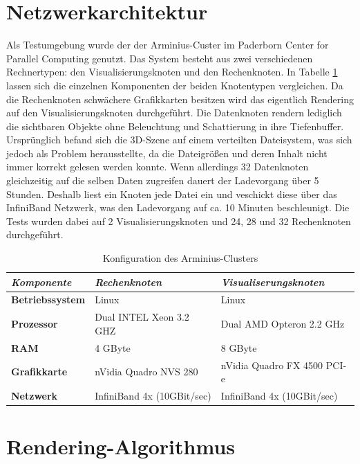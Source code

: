 \section{Netzwerkarchitektur}
\label{sec:impl:netzwerkarchitektur}
Als Testumgebung wurde der der Arminius-Custer im Paderborn Center for Parallel Computing \cite{pc2} genutzt. Das System besteht aus zwei verschiedenen Rechnertypen: den Visualisierungsknoten und den Rechenknoten. In Tabelle \ref{tab:impl:arminius} lassen sich die einzelnen Komponenten der beiden Knotentypen vergleichen. Da die Rechenknoten schwächere Grafikkarten besitzen wird das eigentlich Rendering auf den Visualisierungsknoten durchgeführt. Die Datenknoten rendern lediglich die sichtbaren Objekte ohne Beleuchtung und Schattierung in ihre Tiefenbuffer.\\
Ursprünglich befand sich die 3D-Szene auf einem verteilten Dateisystem, was sich jedoch als Problem herausstellte, da die Dateigrößen und deren Inhalt nicht immer korrekt gelesen werden konnte. Wenn allerdings 32 Datenknoten gleichzeitig auf die selben Daten zugreifen dauert der Ladevorgang über 5 Stunden. Deshalb liest ein Knoten jede Datei ein und veschickt diese über das InfiniBand Netzwerk, was den Ladevorgang auf ca. 10 Minuten beschleunigt. Die Tests wurden dabei auf 2 Visualisierungsknoten und 24, 28 und 32 Rechenknoten durchgeführt.

\begin{table}
 \centering
 \begin{tabular}{lll} %
  \toprule %
  \textit{Komponente} & \textit{Rechenknoten} & \textit{Visualiserungsknoten} \\
  \midrule
  \textbf{Betriebssystem} & Linux & Linux \\
  \textbf{Prozessor} & Dual INTEL Xeon 3.2 GHZ & Dual AMD Opteron 2.2 GHz \\
  \textbf{RAM} & 4 GByte & 8 GByte \\
  \textbf{Grafikkarte} & nVidia Quadro NVS 280 & nVidia Quadro FX 4500 PCI-e \\
  \textbf{Netzwerk} & InfiniBand 4x (10GBit/sec) & InfiniBand 4x (10GBit/sec) \\
  \bottomrule
 \end{tabular} 
 \caption{Konfiguration des Arminius-Clusters}
 \label{tab:impl:arminius}
\end{table}

\section{Rendering-Algorithmus}
\label{sec:impl:renderalgo}

